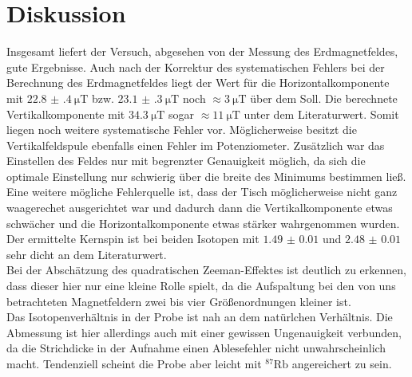 \documentclass[
  bibliography=totoc,     %
  captions=tableheading,  %
  titlepage=firstiscover, %
]{scrartcl}
\begin{document}
\section{Diskussion}
\label{sec:diskussion}
Insgesamt liefert der Versuch, abgesehen von der Messung des Erdmagnetfeldes, gute
Ergebnisse. Auch nach der Korrektur des systematischen Fehlers bei der Berechnung
des Erdmagnetfeldes liegt der Wert für die Horizontalkomponente mit
$\SI{22.8(4)}{\micro\tesla}$ bzw. $\SI{23.1(3)}{\micro\tesla}$ noch
$\approx \SI{3}{\micro\tesla}$ über dem Soll. Die berechnete Vertikalkomponente
mit $\SI{34.3}{\micro\tesla}$ sogar $\approx \SI{11}{\micro\tesla}$ unter dem
Literaturwert. Somit liegen noch weitere systematische Fehler vor. Möglicherweise
besitzt die Vertikalfeldspule ebenfalls einen Fehler im Potenziometer. Zusätzlich
war das Einstellen des Feldes nur mit begrenzter Genauigkeit möglich, da sich
die optimale Einstellung nur schwierig über die breite des Minimums bestimmen
ließ. Eine weitere mögliche Fehlerquelle ist, dass der Tisch möglicherweise
nicht ganz waagerechet ausgerichtet war und dadurch dann die Vertikalkomponente
etwas schwächer und die Horizontalkomponente etwas stärker wahrgenommen wurden.\\
Der ermittelte Kernspin ist bei beiden Isotopen mit $\num{1.49(1)}$ und $\num{2.48(1)}$
sehr dicht an dem Literaturwert.\\
Bei der Abschätzung des quadratischen Zeeman-Effektes ist deutlich zu erkennen,
dass dieser hier nur eine kleine Rolle spielt, da die Aufspaltung bei den von
uns betrachteten Magnetfeldern zwei bis vier Größenordnungen kleiner ist.\\
Das Isotopenverhältnis in der Probe ist nah an dem natürlchen Verhältnis.
Die Abmessung ist hier allerdings auch mit einer gewissen Ungenauigkeit verbunden,
da die Strichdicke in der Aufnahme einen Ablesefehler nicht unwahrscheinlich macht.
Tendenziell scheint die Probe aber leicht mit $^{87}\mathup{Rb}$ angereichert zu sein.
\newpage
\nocite{*}
\printbibliography
\end{document}
